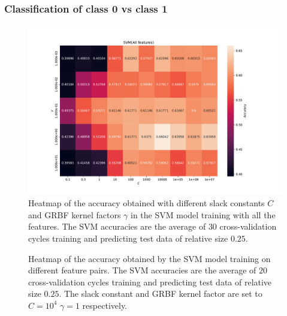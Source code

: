 \subsubsection{Classification of class 0 vs class 1}

\begin{figure}[H]
\centering
\includegraphics[width=1\textwidth]{Figures/accuracy(C,gamma)4}
\caption{Heatmap of the accuracy obtained with different slack constants $C$ and 
GRBF kernel factors $\gamma $ in the SVM model training with all the features. The SVM accuracies are the average of $30$ cross-validation 
cycles training and predicting test data of relative size $0.25$.}
\label{fig:Figures-accuracy-C-gamma-4}
\end{figure}

\begin{figure}[H]
\centering
{}
\caption{Heatmap of the accuracy obtained by the SVM model training on different feature pairs. The SVM accuracies are the average 
of $20$ cross-validation cycles training and predicting test data of relative size $0.25$.
The slack constant and GRBF kernel factor are set to $C=10^4$  $\gamma=1 $ respectively. }
\label{fig:Figures-feature_pairs4}
\end{figure}

